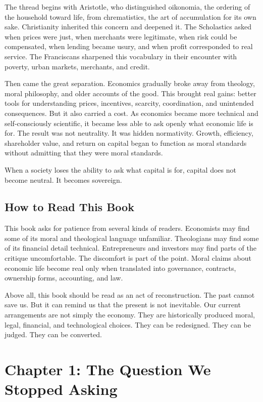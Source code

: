 \documentclass[11pt,a4paper,oneside]{book}
\begin{document}
The thread begins with Aristotle, who distinguished oikonomia, the ordering of the household toward life, from chrematistics, the art of accumulation for its own sake. Christianity inherited this concern and deepened it. The Scholastics asked when prices were just, when merchants were legitimate, when risk could be compensated, when lending became usury, and when profit corresponded to real service. The Franciscans sharpened this vocabulary in their encounter with poverty, urban markets, merchants, and credit.

Then came the great separation. Economics gradually broke away from theology, moral philosophy, and older accounts of the good. This brought real gains: better tools for understanding prices, incentives, scarcity, coordination, and unintended consequences. But it also carried a cost. As economics became more technical and self-consciously scientific, it became less able to ask openly what economic life is for. The result was not neutrality. It was hidden normativity. Growth, efficiency, shareholder value, and return on capital began to function as moral standards without admitting that they were moral standards.

When a society loses the ability to ask what capital is for, capital does not become neutral. It becomes sovereign.

\section*{How to Read This Book}

This book asks for patience from several kinds of readers. Economists may find some of its moral and theological language unfamiliar. Theologians may find some of its financial detail technical. Entrepreneurs and investors may find parts of the critique uncomfortable. The discomfort is part of the point. Moral claims about economic life become real only when translated into governance, contracts, ownership forms, accounting, and law.

Above all, this book should be read as an act of reconstruction. The past cannot save us. But it can remind us that the present is not inevitable. Our current arrangements are not simply the economy. They are historically produced moral, legal, financial, and technological choices. They can be redesigned. They can be judged. They can be converted.

\chapter*{Chapter 1: The Question We Stopped Asking}
\end{document}
